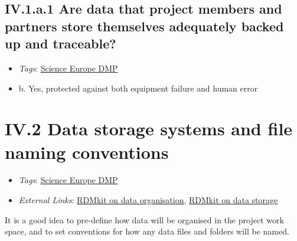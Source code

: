 \documentclass[a4paper,12pt]{report}
\begin{document}
\subsection*{\protect\textcolor{colorSecId}{IV.1.a.1} Are data that project members and partners store themselves adequately backed up and traceable?}

\label{10a10ffd-bfe1-4c6b-bbb6-3dfb1e63a5d5.72099c46-16e7-47a2-a320-cc768b7085fe.1d6ba101-fd62-43c8-ab53-76bc31847f58.c1e83bdf-5914-44c2-8414-0a4e7fbaf272}


\begin{itemize}
  \item \textit{Tags}: \ul{Science Europe DMP}
  \end{itemize}




\begin{itemize}
  \item[\CheckmarkBold] b. Yes, protected against both equipment failure and human error
\end{itemize}






\section*{\protect\textcolor{colorSecId}{IV.2} Data storage systems and file naming conventions}

\label{10a10ffd-bfe1-4c6b-bbb6-3dfb1e63a5d5.bc5e3dbf-2923-4025-a49a-f204b01d4018}


\begin{itemize}
  \item \textit{Tags}: \ul{Science Europe DMP}
  
  \item \textit{External Links}: \href{https://rdmkit.elixir-europe.org/data_organisation.html}{RDMkit on data organisation}, \href{https://rdmkit.elixir-europe.org/storage.html}{RDMkit on data storage}\end{itemize}


\noindent
\begin{markdown}
It is a good idea to pre-define how data will be organised in the project work space, and to set conventions for how any data files and folders will be named.
\end{markdown}
\end{document}
